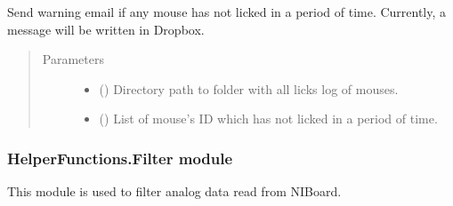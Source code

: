 \documentclass[letterpaper,10pt,english]{sphinxmanual}
\begin{document}
\begin{fulllineitems}
\label{\detokenize{NoSeMazeControl/HelperFunctions:HelperFunctions.Email.warning_licks}}
\pysigstartsignatures
{}
\pysigstopsignatures
\sphinxAtStartPar
Send warning e\sphinxhyphen{}mail if any mouse has not licked in a period of time.
Currently, a message will be written in Dropbox.
\begin{quote}\begin{description}
\item[{Parameters}] \leavevmode\begin{itemize}
\item {} 
\sphinxAtStartPar
{} () \textendash{} Directory path to folder with all licks log of mouses.

\item {} 
\sphinxAtStartPar
{} () \textendash{} List of mouse’s ID which has not licked in a period of time.

\end{itemize}

\end{description}\end{quote}

\end{fulllineitems}


\begin{DUlineblock}{0em}
\item[] 
\end{DUlineblock}


\subsubsection{HelperFunctions.Filter module}
\label{\detokenize{NoSeMazeControl/HelperFunctions:module-HelperFunctions.Filter}}\label{\detokenize{NoSeMazeControl/HelperFunctions:helperfunctions-filter-module}}
\sphinxAtStartPar
This module is used to filter analog data read from NI\sphinxhyphen{}Board.
\end{document}
